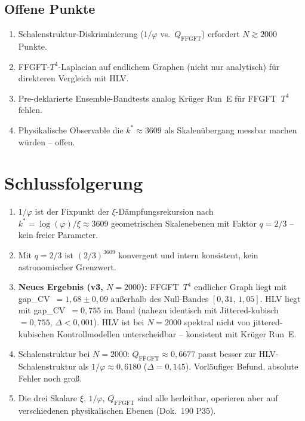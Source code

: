 \subsection{Offene Punkte}

\begin{enumerate}
  \item Schalenstruktur-Diskriminierung ($1/\varphi$ vs.\ $Q_\mathrm{FFGFT}$)
        erfordert $N \gtrsim 2000$ Punkte.
  \item FFGFT-$T^4$-Laplacian auf endlichem Graphen (nicht nur analytisch)
        für direkteren Vergleich mit HLV.
  \item Pre-deklarierte Ensemble-Bandtests analog Krüger Run~E für
        FFGFT~$T^4$ fehlen.
  \item Physikalische Observable die $k^* \approx 3609$ als Skalenübergang
        messbar machen würden -- offen.
\end{enumerate}

\section{Schlussfolgerung}

\begin{enumerate}
  \item $1/\varphi$ ist der Fixpunkt der $\xi$-Dämpfungsrekursion nach
        $k^* = \log(\varphi)/\xi \approx 3609$ geometrischen Skalenebenen
        mit Faktor $q = 2/3$ -- kein freier Parameter.
  \item Mit $q = 2/3$ ist $(2/3)^{3609}$ konvergent und intern konsistent,
        kein astronomischer Grenzwert.
  \item \textbf{Neues Ergebnis (v3, $N=2000$):} FFGFT~$T^4$ endlicher Graph
        liegt mit gap\_CV~$= 1{,}68 \pm 0{,}09$ außerhalb des Null-Bandes
        $[0{,}31,\,1{,}05]$. HLV liegt mit gap\_CV~$= 0{,}755$ im Band
        (nahezu identisch mit Jittered-kubisch~$= 0{,}755$, $\Delta < 0{,}001$).
        HLV ist bei $N=2000$ spektral nicht von jittered-kubischen
        Kontrollmodellen unterscheidbar -- konsistent mit Krüger Run~E.
  \item Schalenstruktur bei $N=2000$: $Q_\mathrm{FFGFT} \approx 0{,}6677$
        passt besser zur HLV-Schalenstruktur als $1/\varphi \approx 0{,}6180$
        ($\Delta = 0{,}145$). Vorläufiger Befund, absolute Fehler noch groß.
  \item Die drei Skalare $\xi$, $1/\varphi$, $Q_\mathrm{FFGFT}$ sind alle
        herleitbar, operieren aber auf verschiedenen physikalischen Ebenen
        (Dok.~190 P35).
\end{enumerate}

